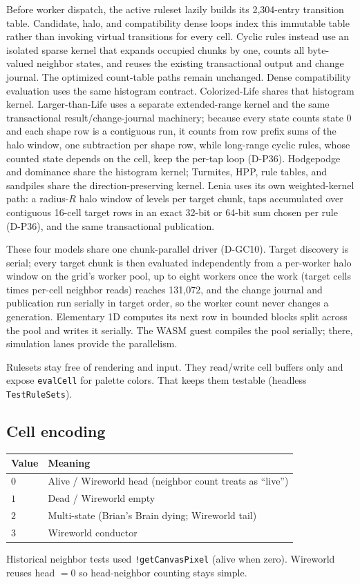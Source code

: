 Before worker dispatch, the active ruleset lazily builds its 2,304-entry
transition table. Candidate, halo, and compatibility dense loops index this
immutable table rather than invoking virtual transitions for every cell.
Cyclic rules instead use an isolated sparse kernel that expands occupied
chunks by one, counts all byte-valued neighbor states, and reuses the existing
transactional output and change journal. The optimized count-table paths remain
unchanged. Dense compatibility evaluation uses the same histogram contract.
Colorized-Life shares that histogram kernel. Larger-than-Life uses a separate
extended-range kernel and the same transactional result/change-journal
machinery; because every state counts state 0 and each shape row is a
contiguous run, it counts from row prefix sums of the halo window, one
subtraction per shape row, while long-range cyclic rules, whose counted state
depends on the cell, keep the per-tap loop (D-P36). Hodgepodge and dominance
share the histogram kernel; Turmites, HPP, rule tables, and sandpiles share the
direction-preserving kernel. Lenia uses its own weighted-kernel path: a
radius-$R$ halo window of levels per target chunk, taps accumulated over
contiguous 16-cell target rows in an exact 32-bit or 64-bit sum chosen per
rule (D-P36), and the same transactional publication.

These four models share one chunk-parallel driver (D-GC10). Target discovery
is serial; every target chunk is then evaluated independently from a
per-worker halo window on the grid's worker pool, up to eight workers once the
work (target cells times per-cell neighbor reads) reaches 131,072, and the
change journal and publication run serially in target order, so the worker
count never changes a generation. Elementary 1D computes its next row in
bounded blocks split across the pool and writes it serially. The WASM guest
compiles the pool serially; there, simulation lanes provide the parallelism.

\begin{decisionbox}[title={Keep rules pure}]
Rulesets stay free of rendering and input. They read/write cell buffers only
and expose \texttt{evalCell} for palette colors. That keeps them testable
(headless \texttt{TestRuleSets}).
\end{decisionbox}

\subsection{Cell encoding}
\begin{center}
\begin{tabular}{@{}ll@{}}
\toprule
\textbf{Value} & \textbf{Meaning} \\
\midrule
$0$ & Alive / Wireworld head (neighbor count treats as ``live'') \\
$1$ & Dead / Wireworld empty \\
$2$ & Multi-state (Brian's Brain dying; Wireworld tail) \\
$3$ & Wireworld conductor \\
\bottomrule
\end{tabular}
\end{center}
Historical neighbor tests used \texttt{!getCanvasPixel} (alive when zero).
Wireworld reuses head $=0$ so head-neighbor counting stays simple.
